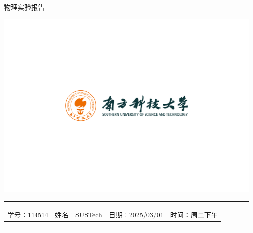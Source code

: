 \documentclass[12pt,a4paper]{article}
\begin{document}
	\noindent
	\hspace{-2em}
	\begin{minipage}[c]{0.65\textwidth}
		\raggedright
		{\fontsize{40pt}{60pt}\selectfont 物理实验报告}
	\end{minipage}
	\begin{minipage}[c]{0.35\textwidth}
		\raggedleft
		\includegraphics[width=\linewidth, trim={20cm 20cm 20cm 20cm}, clip]{university_logo.png}
	\end{minipage}

	\vspace{-1em}
	

	
	\hrule
	\vspace{0.4em}
	\noindent
	\begin{tabular}{l l l l}
    学号：\underline{114514} & 姓名：\underline{SUSTech} &
    日期：\underline{2025/03/01} & 时间：\underline{周二下午}
	\end{tabular}
	\vspace{-0em}
	\par
	\hrule

	

\end{document}
